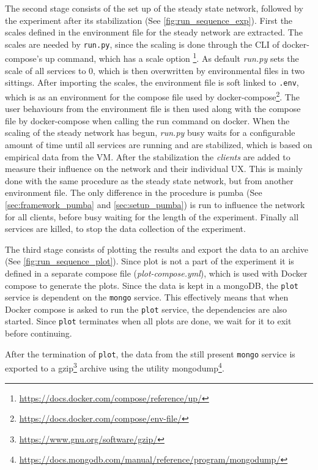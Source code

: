 The second stage consists of the set up of the steady state network, followed by the experiment after its stabilization (See \autoref{fig:run_sequence_exp}). First the scales defined in the environment file for the steady network are extracted. The scales are needed by \texttt{run.py}, since the scaling is done through the \ac{CLI} of docker-compose's up command, which has a scale option \footnote{\url{https://docs.docker.com/compose/reference/up/}}. As default \textit{run.py} sets the scale of all services to 0, which is then overwritten by environmental files in two sittings.
After importing the scales, the environment file is soft linked to \texttt{.env}, which is as an environment for the compose file used by docker-compose\footnote{\url{https://docs.docker.com/compose/env-file/}}.
The user behaviours from the environment file is then used along with the compose file by docker-compose when calling the run command on docker.
When the scaling of the steady network has begun, \textit{run.py} busy waits for a configurable amount of time until all services are running and are stabilized, which is based on empirical data from the \ac{VM}.
After the stabilization the \textit{clients} are added to measure their influence on the network and their individual \ac{UX}. This is mainly done with the same procedure as the steady state network, but from another environment file. The only difference in the procedure is pumba (See \autoref{sec:framework_pumba}
 and \ref{sec:setup_pumba}) is run to influence the network for all clients, before busy waiting for the length of the experiment.
Finally all services are killed, to stop the data collection of the experiment.



The third stage consists of plotting the results and export the data to an archive (See \autoref{fig:run_sequence_plot}). Since plot is not a part of the experiment it is defined in a separate compose file (\textit{plot-compose.yml}), which is used with Docker compose to generate the plots. Since the data is kept in a mongoDB, the \texttt{plot} service is dependent on the \texttt{mongo} service. This effectively means that when Docker compose is asked to run the \texttt{plot} service, the dependencies are also started. Since \texttt{plot} terminates when all plots are done, we wait for it to exit before continuing.

After the termination of \texttt{plot}, the data from the still present \texttt{mongo} service is exported to a gzip\footnote{\url{https://www.gnu.org/software/gzip/}} archive using the utility mongodump\footnote{\url{https://docs.mongodb.com/manual/reference/program/mongodump/}}. 



